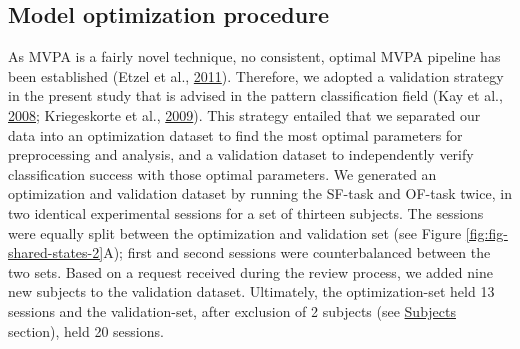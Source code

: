\documentclass[11pt,american,a4paper,oneside,]{memoir} %
\begin{document}
\hypertarget{shared-states-methods-model-optimization-procedure}{%
\subsection{Model optimization procedure}\label{shared-states-methods-model-optimization-procedure}}

As MVPA is a fairly novel technique, no consistent, optimal MVPA pipeline has been established (Etzel et al., \protect\hyperlink{ref-etzel2011impact}{2011}). Therefore, we adopted a validation strategy in the present study that is advised in the pattern classification field (Kay et al., \protect\hyperlink{ref-kay2008identifying}{2008}; Kriegeskorte et al., \protect\hyperlink{ref-kriegeskorte2009circular}{2009}). This strategy entailed that we separated our data into an optimization dataset to find the most optimal parameters for preprocessing and analysis, and a validation dataset to independently verify classification success with those optimal parameters. We generated an optimization and validation dataset by running the SF-task and OF-task twice, in two identical experimental sessions for a set of thirteen subjects. The sessions were equally split between the optimization and validation set (see Figure \ref{fig:fig-shared-states-2}A); first and second sessions were counterbalanced between the two sets. Based on a request received during the review process, we added nine new subjects to the validation dataset. Ultimately, the optimization-set held 13 sessions and the validation-set, after exclusion of 2 subjects (see \protect\hyperlink{shared-states-methods-subjects}{Subjects} section), held 20 sessions.
\end{document}
